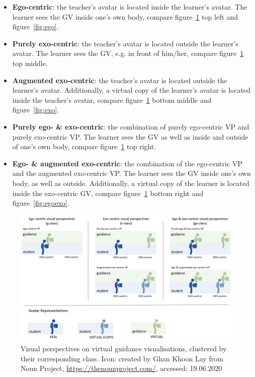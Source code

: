 \begin{itemize}
	\item \textbf{Ego-centric}: the teacher's avatar is located inside the learner's avatar. The learner sees the GV inside one's own body, compare figure~\ref{fig:perspectives} top left and figure~\ref{fig:ego}.
	\item \textbf{Purely exo-centric}: the teacher's avatar is located outside the learner's avatar. The learner sees the GV, e.g. in front of him/her, compare figure~\ref{fig:perspectives} top middle.
	\item \textbf{Augmented exo-centric}: the teacher's avatar is located outside the learner's avatar. Additionally, a virtual copy of the learner's avatar is located inside the teacher's avatar, compare figure~\ref{fig:perspectives} bottom middle and figure~\ref{fig:exo}.
	\item \textbf{Purely ego- \& exo-centric}: the combination of purely ego-centric VP and purely exo-centric VP. The learner sees the GV as well as inside and outside of one's own body, compare figure~\ref{fig:perspectives} top right.
	\item \textbf{Ego- \& augmented exo-centric}: the combination of the ego-centric VP and the augmented exo-centric VP. The learner sees the GV inside one's own body, as well as outside. Additionally, a virtual copy of the learner is located inside the exo-centric GV, compare figure~\ref{fig:perspectives} bottom right and figure~\ref{fig:egoexo}.	
\end{itemize}

\begin{figure}[htb]
	\centering
	\includegraphics[width=\textwidth]{figures/perspectives_new.png}
	\caption[Visual perspectives on vitual guidance visualisations]{Visual perspectives on  virtual guidance visualisations, clustered by their corresponding class. Icon: created by Ghan Khoon Lay from Noun Project, \href{https://thenounproject.com/}{https://thenounproject.com/}, accessed: 19.06.2020}
	\label{fig:perspectives}
\end{figure}

